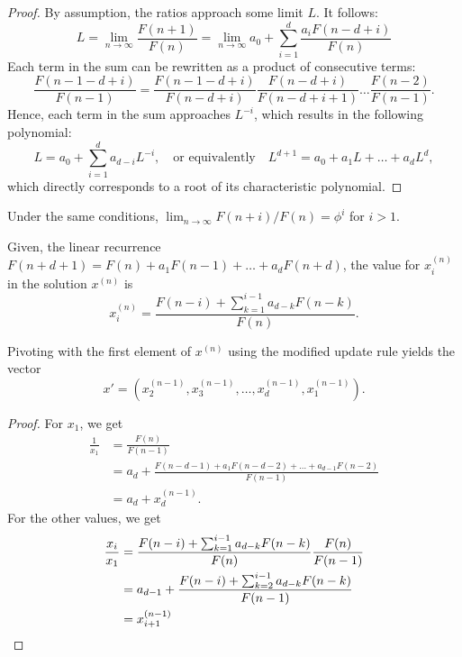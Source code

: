 \documentclass[english,version-2020-11]{uzl-thesis}
\begin{document}
\begin{proof}
  By assumption, the ratios approach some limit $L$. It follows:
  \[
    L
    = \lim_{n \to \infty} \frac{F(n + 1)}{F(n)}
    = \lim_{n \to \infty} a_0 + \sum_{i = 1}^d \frac{a_i F(n - d + i)}{F(n)}
  \]
  Each term in the sum can be rewritten as a product of consecutive terms:
  \[
    \frac{F(n - 1 - d + i)}{F(n - 1)}
    = \frac{F(n - 1 - d + i)}{F(n - d + i)} \frac{F(n - d + i)}{F(n - d + i + 1)} \dots \frac{F(n - 2)}{F(n-1)}.
  \]
  Hence, each term in the sum approaches $L^{-i}$,
  which results in the following polynomial:
  \[
    L = a_0 + \sum_{i = 1}^d a_{d - i} L^{-i},
    \quad \text{or equivalently} \quad
    L^{d+1} = a_0 + a_1 L + \dots + a_d L^d,
  \]
  which directly corresponds to a root of its characteristic polynomial.
\end{proof}

\begin{corollary}
  Under the same conditions, $\lim_{n \to \infty} F(n + i) / F(n) = \phi^i$ for $i > 1$.
\end{corollary}

Given, the linear recurrence $F(n + d + 1) = F(n) + a_1 F(n - 1) + \dots + a_d F(n + d)$,
the value for $x_i^{(n)}$ in the solution $x^{(n)}$ is
\begin{equation}
  \label{eq:general-solution}
  x_i^{(n)} = \frac{F(n - i) + \sum_{k=1}^{i-1} a_{d-k} F(n - k)}{F(n)}.
\end{equation}

\begin{lemma}
  Pivoting with the first element of $x^{(n)}$ using the modified update rule yields the vector
  \[
    x' = (x^{(n-1)}_2, x^{(n-1)}_3, \dots, x^{(n-1)}_d, x^{(n-1)}_1).
  \]
\end{lemma}

\begin{proof}
  For $x_1$, we get
  \[
    \begin{aligned}
      \frac{1}{x_1}
      & = \frac{F(n)}{F(n - 1)} \\
      & = a_d + \frac{F(n - d - 1) + a_1 F(n - d - 2) + \dots + a_{d-1} F(n - 2)}{F(n - 1)} \\
      & = a_d + x^{(n-1)}_d.
    \end{aligned}
  \]
  For the other values, we get
  \begin{align*}
    \frac{x_i}{x_1}
    & = \frac{F(n - i) + \sum_{k=1}^{i-1} a_{d-k} F(n - k)}{F(n)} \frac{F(n)}{F(n - 1)} \\
    & = a_{d-1} + \frac{F(n - i) + \sum_{k=2}^{i-1} a_{d-k} F(n - k)}{F(n-1)} \\
    & = x^{(n-1)}_{i+1} \qedhere
  \end{align*}
\end{proof}
\end{document}
